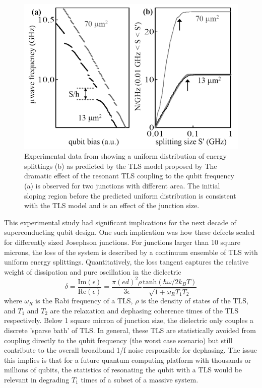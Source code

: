 \documentclass[%
 reprint,
showpacs,
 amsmath,amssymb,
 aps,
longbibliography,
]{revtex4-1}
\begin{document}
\begin{figure}[h!]
  \includegraphics[width=\linewidth]{TLS.png}
  \caption{Experimental data from \cite{Martinis_2005} showing a uniform distribution of energy splittings (b) as predicted by the TLS model proposed by \cite{Mahklin_TLS}
  The dramatic effect of the resonant TLS coupling to the qubit frequency (a) is observed for two junctions with different area. The initial sloping region before the predicted uniform distribution is consistent with the TLS model and is an effect of the junction size.}
  \label{fig:TLS}
\end{figure}

This experimental study had significant implications for the next decade of superconducting qubit design. One such implication was how these defects scaled for differently sized Josephson junctions. For junctions larger than 10 square microns, the loss of the system is described by a continuum ensemble of TLS with uniform energy splittings. Quantitatively, the loss tangent captures the relative weight of dissipation and pure oscillation in the dielectric
\begin{equation*}
\delta = \frac{\textrm{Im}(\epsilon)}{\textrm{Re}(\epsilon)} = \frac{\pi(ed)^2 \rho}{3\epsilon}\frac{\textrm{tanh}(\hbar\omega/2k_B T)}{\sqrt{1+\omega_R T_1 T_2}}
\end{equation*}
where $\omega_R$ is the Rabi frequency of a TLS, $\rho$ is the density of states of the TLS, and $T_1$ and $T_2$ are the relaxation and dephasing coherence times of the TLS respectively. Below 1 square micron of junction size, the dielectric only couples a discrete 'sparse bath' of TLS. In general, these TLS are statistically avoided from coupling directly to the qubit frequency (the worst case scenario) but  still contribute to the overall broadband 1/f noise responsible for dephasing. The issue this implies is that for a future quantum computing platform with thousands or millions of qubits, the statistics of resonating the qubit with a TLS would be relevant in degrading $T_1$ times of a subset of a massive system.
\end{document}
